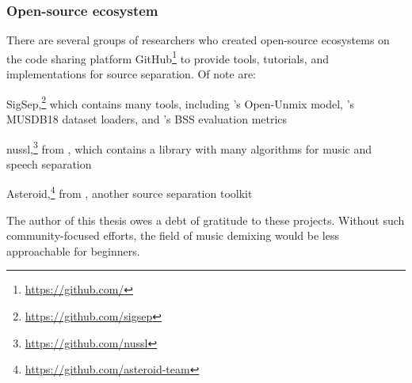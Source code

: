 \documentclass[report.tex]{subfiles}
\begin{document}
\subsubsection{Open-source ecosystem}

There are several groups of researchers who created open-source ecosystems on the code sharing platform GitHub\footnote{\url{https://github.com/}} to provide tools, tutorials, and implementations for source separation. Of note are:

\begin{tight_enumerate}
	\item
		SigSep,\footnote{\url{https://github.com/sigsep}} which contains many tools, including \textcite{umx}'s Open-Unmix model, \textcite{musdb18, musdb18hq}'s MUSDB18 dataset loaders, and \textcite{bss}'s BSS evaluation metrics
	\item
		nussl,\footnote{\url{https://github.com/nussl}} from \textcite{nussl}, which contains a library with many algorithms for music and speech separation
	\item
		Asteroid,\footnote{\url{https://github.com/asteroid-team}} from \textcite{asteroid}, another source separation toolkit
\end{tight_enumerate}

The author of this thesis owes a debt of gratitude to these projects. Without such community-focused efforts, the field of music demixing would be less approachable for beginners.
\end{document}
